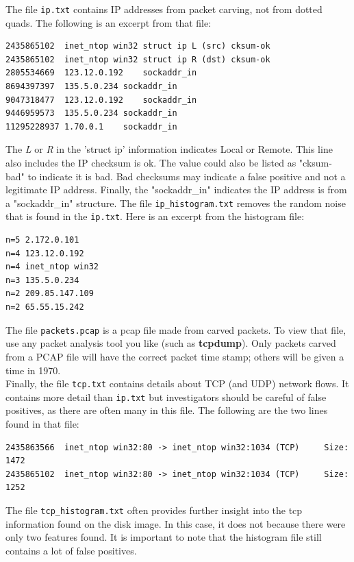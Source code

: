 The file \texttt{ip.txt} contains IP addresses from packet carving, not from dotted quads. The following is an excerpt from that file:
\lstset{style=customfile}
\begin{lstlisting}
2435865102	inet_ntop win32	struct ip L (src) cksum-ok
2435865102	inet_ntop win32	struct ip R (dst) cksum-ok
2805534669	123.12.0.192	sockaddr_in
8694397397	135.5.0.234	sockaddr_in
9047318477	123.12.0.192	sockaddr_in
9446959573	135.5.0.234	sockaddr_in
11295228937	1.70.0.1	sockaddr_in
\end{lstlisting}
The \textit{L} or \textit{R} in the 'struct ip' information indicates Local or Remote. This line also includes the IP checksum is ok. The value could also be listed as "cksum-bad" to indicate it is bad. Bad checksums may indicate a false positive and not a legitimate IP address. Finally, the "sockaddr\_in" indicates the IP address is from a "sockaddr\_in" structure. The file \texttt{ip\_histogram.txt} removes the random noise that is found in the \texttt{ip.txt}. Here is an excerpt from the histogram file:
\lstset{style=customfile}
\begin{lstlisting}
n=5	2.172.0.101
n=4	123.12.0.192
n=4	inet_ntop win32
n=3	135.5.0.234
n=2	209.85.147.109
n=2	65.55.15.242
\end{lstlisting}

The file \texttt{packets.pcap} is a pcap file made from carved packets. To view that file, use any packet analysis tool you like (such as \textbf{tcpdump}). Only packets carved from a PCAP file will have the correct packet time stamp; others will be given a time in 1970.\\

Finally, the file \texttt{tcp.txt} contains details about TCP (and UDP) network flows. It contains more detail than \texttt{ip.txt} but investigators should be careful of false positives, as there are often many in this file. The following are the two lines found in that file:
\lstset{style=customfile}
\begin{lstlisting}
2435863566	inet_ntop win32:80 -> inet_ntop win32:1034 (TCP)	 Size: 1472
2435865102	inet_ntop win32:80 -> inet_ntop win32:1034 (TCP)	 Size: 1252
\end{lstlisting}
The file \texttt{tcp\_histogram.txt} often provides further insight into the tcp information found on the disk image. In this case, it does not because there were only two features found. It is important to note that the histogram file still contains a lot of false positives.
